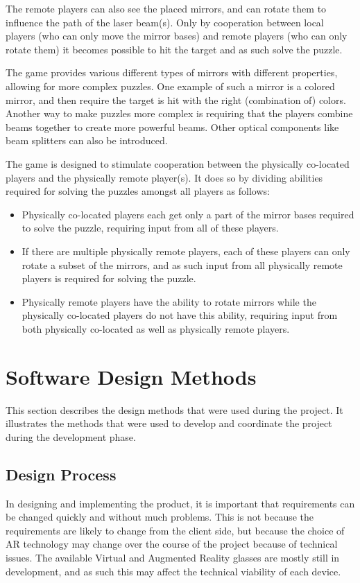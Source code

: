    The remote players can also see the placed mirrors, and can rotate them
    to influence the path of the laser beam(s). Only by cooperation between
    local players (who can only move the mirror bases) and remote players
    (who can only rotate them) it becomes possible to hit the target and as
    such solve the puzzle.

    The game provides various different types of mirrors with different
    properties, allowing for more complex puzzles. One example of such a
    mirror is a colored mirror, and then require the target is hit with the
    right (combination of) colors. Another way to make puzzles more complex
    is requiring that the players combine beams together to create more
    powerful beams. Other optical components like beam splitters can also be
    introduced.

    The game is designed to stimulate cooperation between the physically
    co-located players and the physically remote player(s). It does so by
    dividing abilities required for solving the puzzles amongst all players
    as follows:

    \begin{itemize}
      \item Physically co-located players each get only a part of the
            mirror bases required to solve the puzzle, requiring input
            from all of these players.
      \item If there are multiple physically remote players, each of
            these players can only rotate a subset of the mirrors, and
            as such input from all physically remote players is
            required for solving the puzzle.
      \item Physically remote players have the ability to rotate
            mirrors while the physically co-located players do not have
            this ability, requiring input from both physically co-located
            as well as physically remote players.
    \end{itemize}

  \section{Software Design Methods} \label{sec:designmethods}
    This section describes the design methods that were used during the
    project. It illustrates the methods that were used to develop and
    coordinate the project during the development phase.

    \subsection{Design Process} \label{ssec:designprocess}
		In designing and implementing the product, it is important that
		requirements can be changed quickly and without much problems. This is
		not because the requirements are likely to change from the client
		side, but because the choice of AR technology may change over the
		course of the project because of technical issues. The available Virtual
		and Augmented Reality glasses are mostly still in development, and as
		such this may affect the technical viability of each device.
		
